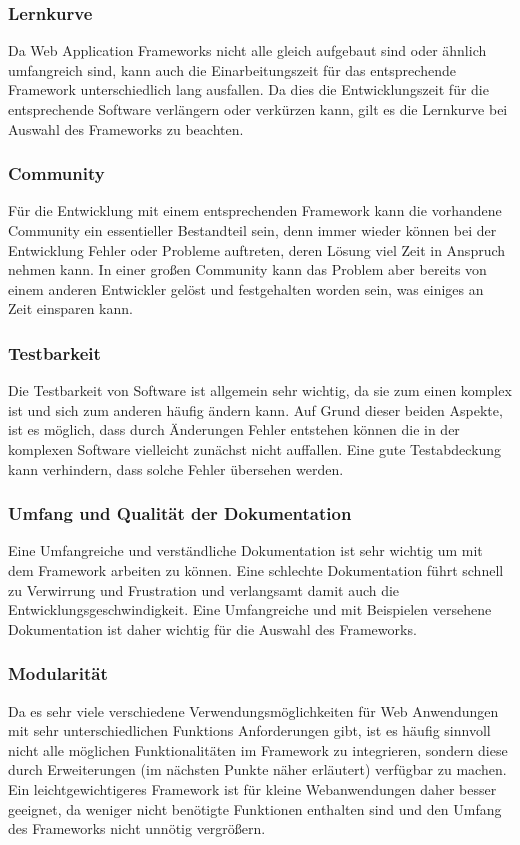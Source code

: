 \subsubsection*{Lernkurve}
Da Web Application Frameworks nicht alle gleich aufgebaut sind oder ähnlich umfangreich sind, kann auch die Einarbeitungszeit für das entsprechende Framework unterschiedlich lang ausfallen. Da dies die Entwicklungszeit für die entsprechende Software verlängern oder verkürzen kann, gilt es die Lernkurve bei Auswahl des Frameworks zu beachten.
\subsubsection*{Community}
Für die Entwicklung mit einem entsprechenden Framework kann die vorhandene Community ein essentieller Bestandteil sein, denn immer wieder können bei der Entwicklung Fehler oder Probleme auftreten, deren Lösung viel Zeit in Anspruch nehmen kann. In einer großen Community kann das Problem aber bereits von einem anderen Entwickler gelöst und festgehalten worden sein, was einiges an Zeit einsparen kann.
\subsubsection*{Testbarkeit}
Die Testbarkeit von Software ist allgemein sehr wichtig, da sie zum einen komplex ist und sich zum anderen häufig ändern kann. Auf Grund dieser beiden Aspekte, ist es möglich, dass durch Änderungen Fehler entstehen können die in der komplexen Software vielleicht zunächst nicht auffallen. Eine gute Testabdeckung kann verhindern, dass solche Fehler übersehen werden.
\subsubsection*{Umfang und Qualität der Dokumentation}
Eine Umfangreiche und verständliche Dokumentation ist sehr wichtig um mit dem Framework arbeiten zu können. Eine schlechte Dokumentation führt schnell zu Verwirrung und Frustration und verlangsamt damit auch die Entwicklungsgeschwindigkeit. Eine Umfangreiche und mit Beispielen versehene Dokumentation ist daher wichtig für die Auswahl des Frameworks.
\subsubsection*{Modularität}
Da es sehr viele verschiedene Verwendungsmöglichkeiten für Web Anwendungen mit sehr unterschiedlichen Funktions Anforderungen gibt, ist es häufig sinnvoll nicht alle möglichen Funktionalitäten im Framework zu integrieren, sondern diese durch Erweiterungen (im nächsten Punkte näher erläutert) verfügbar zu machen. Ein leichtgewichtigeres Framework ist für kleine Webanwendungen daher besser geeignet, da weniger nicht benötigte Funktionen enthalten sind und den Umfang des Frameworks nicht unnötig vergrößern.
